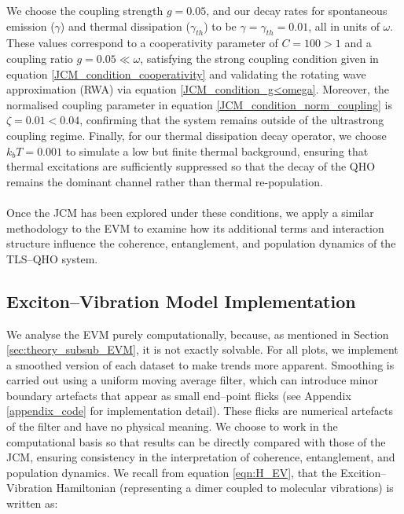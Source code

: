 \documentclass[11pt]{article}
\begin{document}
We choose the coupling strength $g = 0.05$, and our decay rates for spontaneous emission ($\gamma$) and thermal dissipation ($\gamma_{\scriptscriptstyle th}$) to be $\gamma = \gamma_{\scriptscriptstyle th} = 0.01$, all in units of $\omega$. These values correspond to a cooperativity parameter of $C = 100 > 1$ and a coupling ratio $g = 0.05 \ll \omega$, satisfying the strong coupling condition given in equation \eqref{JCM_condition_cooperativity} and validating the rotating wave approximation (RWA) via equation \eqref{JCM_condition_g<omega}. Moreover, the normalised coupling parameter in equation \eqref{JCM_condition_norm_coupling} is $\zeta = 0.01 < 0.04$, confirming that the system remains outside of the ultrastrong coupling regime. Finally, for our thermal dissipation decay operator, we choose $k_bT = 0.001$ to simulate a low but finite thermal background, ensuring that thermal excitations are sufficiently suppressed so that the decay of the QHO remains the dominant channel rather than thermal re-population.\\
\\
Once the JCM has been explored under these conditions, we apply a similar methodology to the EVM to examine how its additional terms and interaction structure influence the coherence, entanglement, and population dynamics of the TLS--QHO system. 
\subsection{Exciton--Vibration Model Implementation} \label{sec:method_sub_EVM}
We analyse the EVM purely computationally, because, as mentioned in Section \ref{sec:theory_subsub_EVM}, it is not exactly solvable. For all plots, we implement a smoothed version of each dataset to make trends more apparent. Smoothing is carried out using a uniform moving average filter, which can introduce minor boundary artefacts that appear as small end--point flicks (see Appendix \ref{appendix_code} for implementation detail). These flicks are numerical artefacts of the filter and have no physical meaning. We choose to work in the computational basis so that results can be directly compared with those of the JCM, ensuring consistency in the interpretation of coherence, entanglement, and population dynamics. We recall from equation \eqref{eqn:H_EV}, that the Excition--Vibration Hamiltonian (representing a dimer coupled to molecular vibrations) is written as:
\end{document}
